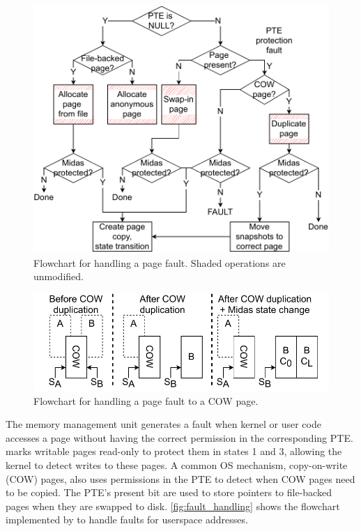 \documentclass[letterpaper,twocolumn,10pt]{article}
\begin{document}
\begin{figure}[h]
  \centering
  \includegraphics[width=\linewidth]{img/pagefault.pdf}
  \caption{Flowchart for handling a page fault. Shaded 
          operations are unmodified.}
  \label{fig:fault_handling}
\end{figure}

\begin{figure}[h]
  \centering
  \includegraphics[width=\linewidth]{img/pagefault_cow.pdf}
  \caption{Flowchart for handling a page fault to a COW page.}
  \label{fig:fault_handling_cow}
\end{figure}

The memory management unit generates a fault when kernel or user code accesses
a page without having the correct permission in the corresponding PTE.
\midas marks writable pages read-only to protect them in 
states 1 and 3, allowing the kernel to detect writes to these pages.
A common OS mechanism, copy-on-write (COW) pages, also uses 
permissions in the PTE to detect when COW pages need to be copied.
The PTE's present bit are used to store pointers to file-backed pages
when they are swapped to disk.
\autoref{fig:fault_handling} shows the flowchart implemented by
 to handle faults for userspace addresses.
\end{document}
